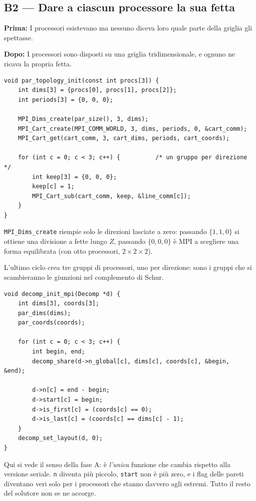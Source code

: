 \documentclass[11pt,a4paper]{article}
\newcommand{\prima}[1]{\par\smallskip\noindent\textbf{\color{scuro}Prima:} #1\par}
\newcommand{\dopo}[1]{\par\smallskip\noindent\textbf{\color{scuro}Dopo:} #1\par\smallskip}
\newcommand{\cd}[1]{\texttt{\small #1}}
\begin{document}
\subsection*{B2 --- Dare a ciascun processore la sua fetta}

\prima{I processori esistevano ma nessuno diceva loro quale parte della griglia
gli spettasse.}
\dopo{I processori sono disposti su una griglia tridimensionale, e ognuno ne
ricava la propria fetta.}

\begin{lstlisting}
void par_topology_init(const int procs[3]) {
    int dims[3] = {procs[0], procs[1], procs[2]};
    int periods[3] = {0, 0, 0};

    MPI_Dims_create(par_size(), 3, dims);
    MPI_Cart_create(MPI_COMM_WORLD, 3, dims, periods, 0, &cart_comm);
    MPI_Cart_get(cart_comm, 3, cart_dims, periods, cart_coords);

    for (int c = 0; c < 3; c++) {          /* un gruppo per direzione */
        int keep[3] = {0, 0, 0};
        keep[c] = 1;
        MPI_Cart_sub(cart_comm, keep, &line_comm[c]);
    }
}
\end{lstlisting}

\cd{MPI\_Dims\_create} riempie solo le direzioni lasciate a zero: passando
$\{1,1,0\}$ si ottiene una divisione a fette lungo $Z$, passando $\{0,0,0\}$ è
MPI a scegliere una forma equilibrata (con otto processori, $2\times2\times2$).

L'ultimo ciclo crea tre gruppi di processori, uno per direzione: sono i gruppi
che si scambieranno le giunzioni nel complemento di Schur.

\begin{lstlisting}
void decomp_init_mpi(Decomp *d) {
    int dims[3], coords[3];
    par_dims(dims);
    par_coords(coords);

    for (int c = 0; c < 3; c++) {
        int begin, end;
        decomp_share(d->n_global[c], dims[c], coords[c], &begin, &end);

        d->n[c] = end - begin;
        d->start[c] = begin;
        d->is_first[c] = (coords[c] == 0);
        d->is_last[c] = (coords[c] == dims[c] - 1);
    }
    decomp_set_layout(d, 0);
}
\end{lstlisting}

Qui si vede il senso della fase A: è \emph{l'unica} funzione che cambia rispetto
alla versione seriale. \cd{n} diventa più piccolo, \cd{start} non è più zero, e
i flag delle pareti diventano veri solo per i processori che stanno davvero agli
estremi. Tutto il resto del solutore non se ne accorge.
\end{document}
